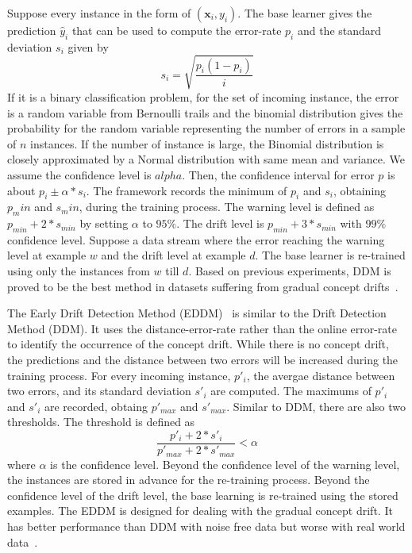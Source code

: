 Suppose every instance in the form of $(\mathbf{x}_i, y_i)$. The base learner gives the prediction $\hat{y}_i$ that can be used to compute the error-rate $p_i$ and the standard deviation $s_i$ given by 
\begin{equation}
s_i = \sqrt{\frac{p_i(1-p_i)}{i}}
\end{equation}
If it is a binary classification problem, for the set of incoming instance, the error is a random variable from Bernoulli trails and the binomial distribution gives the probability for the random variable representing the number of errors in a sample of $n$ instances. If the number of instance is large, the Binomial distribution is closely approximated by a Normal distribution with same mean and variance. We assume the confidence level is $alpha$. Then, the confidence interval for error $p$ is about $p_i\pm\alpha*s_i$. The framework records the minimum of $p_i$ and $s_i$, obtaining $p_min$ and $s_min$, during the training process. The warning level is defined as $p_{min} + 2 * s_{min}$ by setting $\alpha$ to $95\%$. The drift level is $p_{min} + 3 * s_{min}$ with $99\%$ confidence level. Suppose a data stream where the error reaching the warning level at example $w$ and the drift level at example $d$. The base learner is re-trained using only the instances from $w$ till $d$. Based on previous experiments, DDM is proved to be the best method in datasets suffering from gradual concept drifts~\cite{Goncalves2014}.

The Early Drift Detection Method (EDDM)~\cite{baena2006ear} is similar to the Drift Detection Method (DDM). It uses the distance-error-rate rather than the online error-rate to identify the occurrence of the concept drift. While there is no concept drift, the predictions and the distance between two errors will be increased during the training process. For every incoming instance, $p'_i$, the avergae distance between two errors, and its standard deviation $s'_i$ are computed. The maximums of $p'_i$ and $s'_i$ are recorded, obtaing $p'_{max}$ and $s'_{max}$. Similar to DDM, there are also two thresholds. The threshold is defined as 
\begin{equation}
\frac{p'_i + 2 * s'_i} {p'_{max} + 2*s'_{max}}<\alpha
\end{equation}
where $\alpha$ is the confidence level. Beyond the confidence level of the warning level, the instances are stored in advance for the re-training process. Beyond the confidence level of the drift level, the base learning is re-trained using the stored examples. The EDDM is designed for dealing with the gradual concept drift. It has better performance than DDM with noise free data but worse with real world data~\cite{Goncalves2014}.


